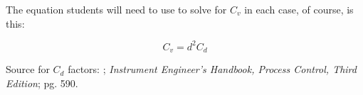
The equation students will need to use to solve for $C_v$ in each case, of course, is this:

$$C_v = d^2 C_d$$

\vskip 10pt

Source for $C_d$ factors: ; {\it Instrument Engineer's Handbook, Process Control, Third Edition}; pg. 590.




